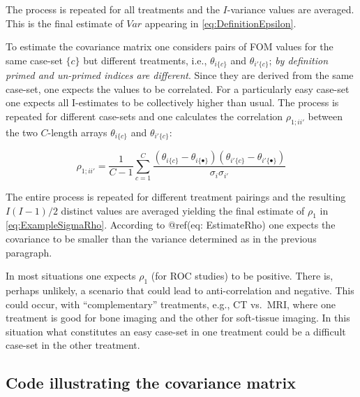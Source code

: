 \documentclass[
]{book}
\begin{document}
The process is repeated for all treatments and the \(I\)-variance values are averaged. This is the final estimate of \(Var\) appearing in \eqref{eq:DefinitionEpsilon}.

To estimate the covariance matrix one considers pairs of FOM values for the same case-set \(\{c\}\) but different treatments, i.e., \(\theta_{i\{c\}}\) and \(\theta_{i'\{c\}}\); \emph{by definition primed and un-primed indices are different}. Since they are derived from the same case-set, one expects the values to be correlated. For a particularly easy case-set one expects all I-estimates to be collectively higher than usual. The process is repeated for different case-sets and one calculates the correlation \(\rho_{1;ii'}\) between the two \(C\)-length arrays \(\theta_{i\{c\}}\) and \(\theta_{i'\{c\}}\):

\begin{equation}
\rho_{1;ii'} = \frac{1}{C-1}\sum_{c=1}^{C} \frac {\left ( \theta_{i\{c\}} - \theta_{i\{\bullet\}} \right) \left ( \theta_{i'\{c\}} - \theta_{i'\{\bullet\}} \right)}{\sigma_i \sigma_{i'} }
\label{eq:EstimateRho}
\end{equation}

The entire process is repeated for different treatment pairings and the resulting \(I(I-1)/2\) distinct values are averaged yielding the final estimate of \(\rho_1\) in \eqref{eq:ExampleSigmaRho}. According to @ref(eq: EstimateRho) one expects the covariance to be smaller than the variance determined as in the previous paragraph.

In most situations one expects \(\rho_1\) (for ROC studies) to be positive. There is, perhaps unlikely, a scenario that could lead to anti-correlation and negative. This could occur, with ``complementary'' treatments, e.g., CT vs.~MRI, where one treatment is good for bone imaging and the other for soft-tissue imaging. In this situation what constitutes an easy case-set in one treatment could be a difficult case-set in the other treatment.

\hypertarget{code-illustrating-the-covariance-matrix}{%
\subsection{Code illustrating the covariance matrix}\label{code-illustrating-the-covariance-matrix}}
\end{document}

